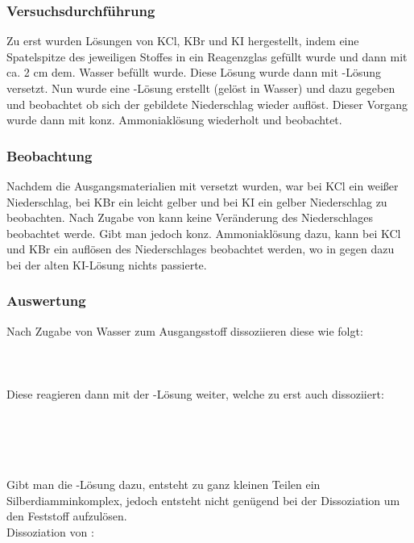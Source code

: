 \documentclass{scrartcl}
\begin{document}
\subsubsection{Versuchsdurchführung}
Zu erst wurden Lösungen von KCl, KBr und KI hergestellt, indem eine Spatelspitze des jeweiligen Stoffes in ein Reagenzglas gefüllt wurde und dann mit ca. 2 cm dem. Wasser befüllt wurde. Diese Lösung wurde dann mit -Lösung versetzt. Nun wurde eine -Lösung erstellt (gelöst in Wasser) und dazu gegeben und beobachtet ob sich der gebildete Niederschlag wieder auflöst. Dieser Vorgang wurde dann mit konz. Ammoniaklösung wiederholt und beobachtet.
\subsubsection{Beobachtung}
Nachdem die Ausgangsmaterialien mit  versetzt wurden, war bei KCl ein weißer Niederschlag, bei KBr ein leicht gelber und bei KI ein gelber Niederschlag zu beobachten.
Nach Zugabe von  kann keine Veränderung des Niederschlages beobachtet werde. Gibt man jedoch konz. Ammoniaklösung dazu, kann bei KCl und KBr ein auflösen des Niederschlages beobachtet werden, wo in gegen dazu bei der alten KI-Lösung nichts passierte.
\subsubsection{Auswertung}
Nach Zugabe von Wasser zum Ausgangsstoff dissoziieren diese wie folgt:\\ 
\\
\\
\\ 
Diese reagieren dann mit der -Lösung weiter, welche zu erst auch dissoziiert:\\ 
\\ \\ 
\\
\\

Gibt man die -Lösung dazu, entsteht zu ganz kleinen Teilen ein Silberdiamminkomplex, jedoch entsteht nicht genügend  bei der Dissoziation um den Feststoff aufzulösen.\\
Dissoziation von :\\ 
\\
\\
\\
\\
\end{document}
